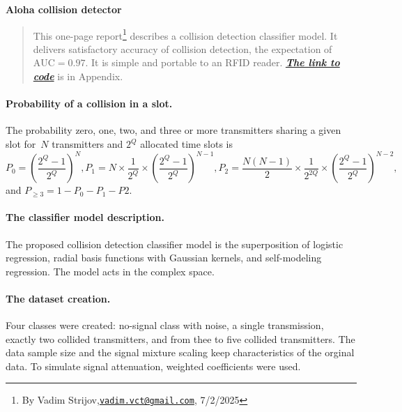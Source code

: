 \documentclass[12pt]{article}
\newcommand{\D}{{2^Q}}
\begin{document}
\begin{center}
{\Huge\bf Aloha collision detector}
\end{center}


\begin{quote}
This one-page report\footnote{By Vadim Strijov,\href{mailto:vadim.vct@gmail.com}{\texttt{vadim.vct@gmail.com}}, 7/2/2025} describes a collision detection classifier model. It delivers satisfactory accuracy of collision detection, the expectation of $\text{AUC} = 0.97$. It is simple and portable to an RFID reader. {\bf \emph{\hyperref[sec:experiment]{The link to code}}} is in Appendix.
\end{quote}


\paragraph{Probability of a collision in a slot.} The probability zero, one, two, and three or more transmitters sharing a given slot for~$N$ transmitters and $2^Q$ allocated time slots is 
\[
P_0 = \left( \frac{\D-1}{\D} \right)^N, 
P_1 = N \times \frac{1}{\D} \times \left(\frac{\D-1}{\D}\right)^{N-1},
P_2 = \frac{N(N-1)}{2}  \times \frac{1}{2^{2Q}} \times \left(\frac{\D-1}{\D}\right)^{N-2},
\]
and $P_{\geq 3} = 1 - P_0 - P_1 - P2$. 

\paragraph{The classifier model description.} The proposed collision detection classifier model is the superposition of logistic regression, radial basis functions with Gaussian kernels, and self-modeling regression. %
The model acts in the complex space.

\paragraph{The dataset creation.} Four classes were created: no-signal class with noise, a single transmission, exactly two collided transmitters, and from thee to five collided transmitters. The data sample size and the signal mixture scaling keep characteristics of the orginal data. To simulate signal attenuation, weighted coefficients were used.
\end{document}
